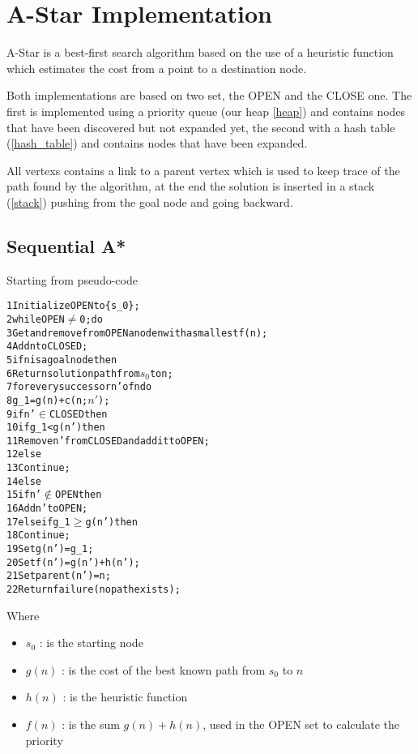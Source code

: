 \section{A-Star Implementation}
\label{Sec:implementation}

A-Star is a best-first search algorithm based on the use of a heuristic function which estimates the cost from a point to a destination node.

Both implementations are based on two set, the OPEN and the CLOSE one. The first is implemented using a priority queue (our heap \ref{heap}) and contains nodes that have been discovered but not expanded yet, the second with a hash table (\ref{hash_table}) and contains nodes that have been expanded.

All vertexs contains a link to a parent vertex which is used to keep trace of the path found by the algorithm, at the end the solution is inserted in a stack (\ref{stack}) pushing from the goal node and going backward.

\subsection{Sequential A*}

Starting from pseudo-code \cite{bibParAstar}

\begin{alltt}
    1 Initialize OPEN to \{s_0\};
    2 while OPEN \(\neq\) 0; do
    3 Get and remove from OPEN a node n with a smallest f(n);
    4 Add n to CLOSED;
    5 if n is a goal node then
    6   Return solution path from \(s_0\) to n;
    7 for every successor n' of n do
    8   g_1 = g(n) + c(n; \(n'\));
    9   if n' \(\in\) CLOSED then
    10      if g_1 < g(n') then
    11          Remove n' from CLOSED and add it to OPEN;
    12      else
    13          Continue;
    14  else
    15      if n' \(\notin\) OPEN then
    16          Add n' to OPEN;
    17      else if g_1 \(\geq\) g(n') then
    18          Continue;
    19  Set g(n') = g_1;
    20  Set f(n') = g(n') + h(n');
    21  Set parent(n') = n;
    22 Return failure (no path exists);
\end{alltt}

Where
\begin{itemize}
    \item $s_0$ : is the starting node
    \item $g(n)$ : is the cost of the best known path from $s_0$ to $n$
    \item $h(n)$ : is the heuristic function
    \item $f(n)$ : is the sum $g(n) + h(n)$, used in the OPEN set to calculate the priority
\end{itemize}

